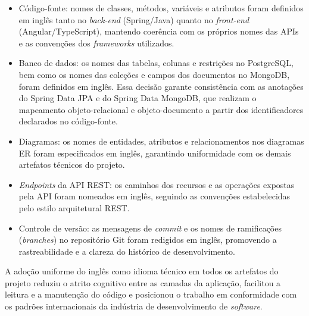 \begin{itemize}
    \item Código-fonte: nomes de classes, métodos, variáveis e atributos foram definidos em inglês tanto no \textit{back-end} (Spring/Java) quanto no \textit{front-end} (Angular/TypeScript), mantendo coerência com os próprios nomes das APIs e as convenções dos \textit{frameworks} utilizados.
    \item Banco de dados: os nomes das tabelas, colunas e restrições no PostgreSQL, bem como os nomes das coleções e campos dos documentos no MongoDB, foram definidos em inglês. Essa decisão garante consistência com as anotações do Spring Data JPA e do Spring Data MongoDB, que realizam o mapeamento objeto-relacional e objeto-documento a partir dos identificadores declarados no código-fonte.
    \item Diagramas: os nomes de entidades, atributos e relacionamentos nos diagramas ER foram especificados em inglês, garantindo uniformidade com os demais artefatos técnicos do projeto.
    \item \textit{Endpoints} da API REST: os caminhos dos recursos e as operações expostas pela API foram nomeados em inglês, seguindo as convenções estabelecidas pelo estilo arquitetural REST.
    \item Controle de versão: as mensagens de \textit{commit} e os nomes de ramificações (\textit{branches}) no repositório Git foram redigidos em inglês, promovendo a rastreabilidade e a clareza do histórico de desenvolvimento.
\end{itemize}

A adoção uniforme do inglês como idioma técnico em todos os artefatos do projeto reduziu o atrito cognitivo entre as camadas da aplicação, facilitou a leitura e a manutenção do código e posicionou o trabalho em conformidade com os padrões internacionais da indústria de desenvolvimento de \textit{software}.
